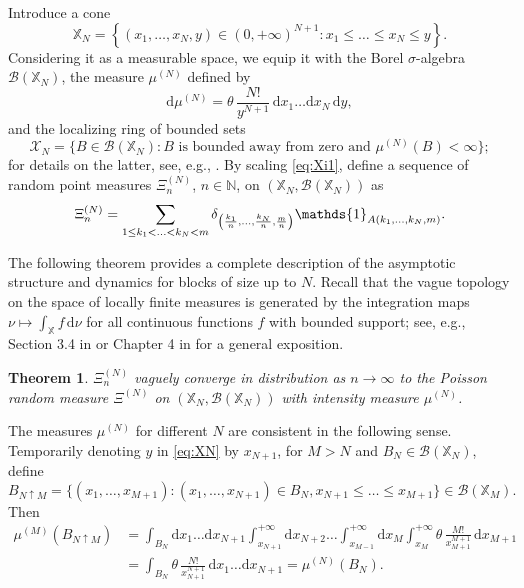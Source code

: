 \documentclass[11pt]{article}
\newcommand{\dd}{\mathrm d}
\newcommand{\X}{\mathbb{X}}
\newcommand{\N}{\mathbb{N}}
\newcommand{\1}[1][]{
	\ifx&#1&\mathds{1}
	\else\mathds{1}\left\{#1\right\}\fi}
\newcommand{\Bc}{\mathcal{B}}
\newtheorem{theorem}{Theorem}[section]
\theoremstyle{definition}
\theoremstyle{remark}
\numberwithin{equation}{section}
\begin{document}
	Introduce a cone
	\begin{equation}
		\label{eq:XN}
		\X_N = \left\{(x_1,\ldots,x_N,y) \in (0,+\infty)^{N+1}: x_1\le\ldots\le x_N\le y\right\}.
	\end{equation}
	Considering it as a measurable space, we equip it with the Borel $\sigma$-algebra $\Bc(\X_N)$, the measure $\mu^{(N)}$ defined by
	\begin{equation}
		\label{eq:mu}
		\dd\mu^{(N)} = \theta\,\frac{N!}{y^{N+1}}\,\dd x_1\ldots\dd x_N\,\dd y,
	\end{equation}
	and the localizing ring of bounded sets
	\begin{equation}
		\label{eq:loc}
		\mathcal{X}_N = \bigl\{B\in\Bc(\X_N):
		\text{$B$ is bounded away from zero and }
		\mu^{(N)}(B)<\infty\bigr\};
	\end{equation}
	for details on the latter, see, e.g., \cite[p.~19]{K17}. By scaling \eqref{eq:Xi1}, 
	define a sequence of random point measures $\Xi_n^{(N)}$, $n\in\N$, on $\left(\X_N,\Bc(\X_N)\right)$ as
	\begin{equation*}
		\Xi_n^{(N)} = 
		\sum_{1\le k_1 < \ldots < k_N < m} 
		\delta_{\left(\frac{k_1}{n},\ldots,\frac{k_N}{n},\frac{m}{n}\right)}
		\1_{A(k_1,\ldots,k_N,m)}.
	\end{equation*}
	
	The following theorem provides a complete description of the asymptotic structure and dynamics for blocks of size up to $N$.
	Recall that the vague topology on the space of locally finite 
	measures is generated by the integration maps 
	$\nu\mapsto\int_\X f\,\dd\nu$ for all continuous functions 
	$f$ with bounded support; see, e.g., Section 3.4 in \cite{R87} 
	or Chapter 4 in \cite{K17} for a general exposition.
	
	\begin{theorem}
		\label{TH:MAIN_TH}
		$\Xi_n^{(N)}$ vaguely converge in distribution as $n\to\infty$ to
		the Poisson random measure $\Xi^{(N)}$ on $\left(\X_N,\Bc(\X_N)\right)$ with
		intensity measure $\mu^{(N)}$.
	\end{theorem}
	
	The measures $\mu^{(N)}$ for different $N$ are consistent in the following sense. Temporarily denoting $y$ in \eqref{eq:XN} by $x_{N+1}$, for $M>N$ and $B_N\in\Bc(\X_N)$, define
	\begin{equation*}
		B_{N\uparrow M} = \{(x_1,\ldots,x_{M+1}):
		(x_1,\ldots,x_{N+1})\in B_N,x_{N+1} \le \ldots \le x_{M+1}\}
		\in \Bc(\X_M).
	\end{equation*}
	Then
	\begin{align*}
		\mu^{(M)}(B_{N\uparrow M}) &= \int_{B_N}\dd x_1\ldots\dd x_{N+1}\int_{x_{N+1}}^{+\infty}\dd x_{N+2}\ldots
		\int_{x_{M-1}}^{+\infty}\dd x_M \int_{x_M}^{+\infty}\theta\,
		\frac{M!}{x_{M+1}^{M+1}}\,\dd x_{M+1}
		\\ &= \int_{B_N}\theta\,\frac{N!}{x_{N+1}^{N+1}}\,\dd x_1\ldots
		\dd x_{N+1}=\mu^{(N)}(B_N).
	\end{align*}
\end{document}
